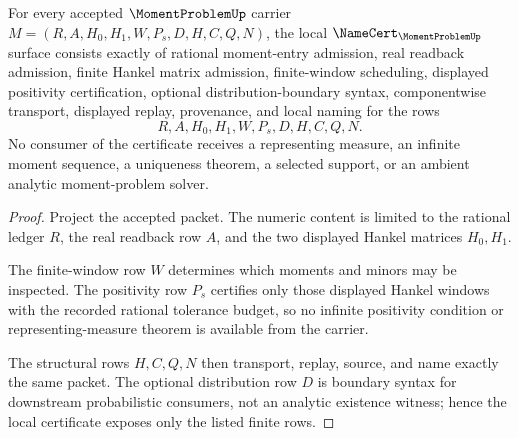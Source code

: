 \begin{theorem}
\label{thm:moment-problem-namecert-obligations}
For every accepted $\MomentProblemUp$ carrier $M=(R,A,H_0,H_1,W,P_s,D,H,C,Q,N)$, the local $\NameCert_{\MomentProblemUp}$ surface consists exactly of rational moment-entry admission, real readback admission, finite Hankel matrix admission, finite-window scheduling, displayed positivity certification, optional distribution-boundary syntax, componentwise transport, displayed replay, provenance, and local naming for the rows
$$
R,A,H_0,H_1,W,P_s,D,H,C,Q,N .
$$
No consumer of the certificate receives a representing measure, an infinite moment sequence, a uniqueness theorem, a selected support, or an ambient analytic moment-problem solver.
\end{theorem}
\begin{proof}
Project the accepted packet. The numeric content is limited to the rational ledger $R$, the real readback row $A$, and the two displayed Hankel matrices $H_0,H_1$.

The finite-window row $W$ determines which moments and minors may be inspected. The positivity row $P_s$ certifies only those displayed Hankel windows with the recorded rational tolerance budget, so no infinite positivity condition or representing-measure theorem is available from the carrier.

The structural rows $H,C,Q,N$ then transport, replay, source, and name exactly the same packet. The optional distribution row $D$ is boundary syntax for downstream probabilistic consumers, not an analytic existence witness; hence the local certificate exposes only the listed finite rows.
\end{proof}

